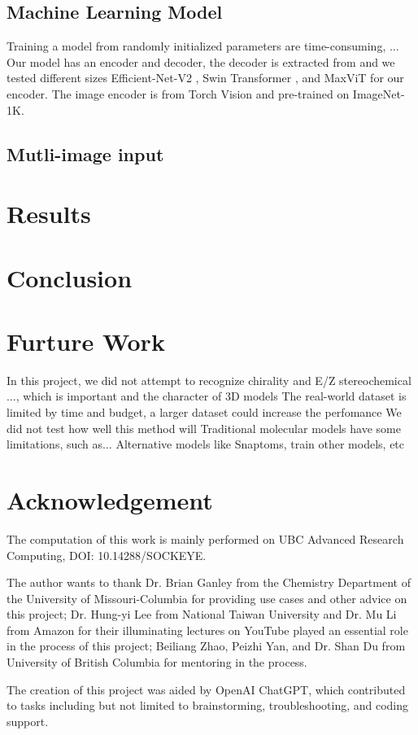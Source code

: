 \documentclass{article}
\begin{document}
\subsection{Machine Learning Model}
Training a model from randomly initialized parameters are time-consuming, ... 
Our model has an encoder and decoder, the decoder is extracted from \cite{swinocsr} and we tested different sizes Efficient-Net-V2 \cite{effv2}, Swin Transformer \cite{swinocsr}, and MaxViT \cite{tu_maxvit:_2022} for our encoder. The image encoder is from Torch Vision and pre-trained on ImageNet-1K. 
\subsection{Mutli-image input}
\section{Results} 
\section{Conclusion}
\section{Furture Work}
In this project, we did not attempt to recognize chirality and E/Z stereochemical  ..., which is important and the character of 3D models 
The real-world dataset is limited by time and budget, a larger dataset could increase the perfomance
We did not test how well this method will 
Traditional molecular models have some limitations, such as... Alternative models like Snaptoms, train other models, etc
\section*{Acknowledgement}
The computation of this work is mainly performed on UBC Advanced Research Computing, DOI: 10.14288/SOCKEYE.

The author wants to thank Dr. Brian Ganley from the Chemistry Department of the University of Missouri-Columbia for providing use cases and other advice on this project; Dr. Hung-yi Lee from National Taiwan University and Dr. Mu Li from Amazon for their illuminating lectures on YouTube played an essential role in the process of this project; Beiliang Zhao, Peizhi Yan, and Dr. Shan Du from University of British Columbia for mentoring in the process. 

The creation of this project was aided by OpenAI ChatGPT, which contributed to tasks including but not limited to brainstorming, troubleshooting, and coding support.

\end{document}
